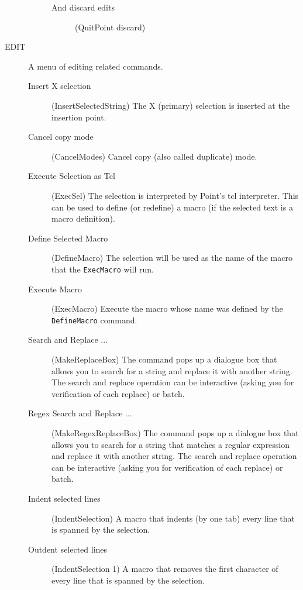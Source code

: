 \begin{description}
\begin{description}
\begin{description}
		\item[And discard edits] (QuitPoint discard)

	\end{description}

	\end{description}

\item[EDIT] A menu of editing related commands.
	\begin{description}

	\item[Insert X selection] (InsertSelectedString)
	The X (primary) selection is inserted at the
	insertion point.

	\item[Cancel copy mode] (CancelModes)
	Cancel copy (also called duplicate) mode.

	\item[Execute Selection as Tcl] (ExecSel)
		The selection is interpreted by Point's tcl
		interpreter.  This can be used to define
		(or redefine) a macro (if the selected text
		is a macro definition).

	\item[Define Selected Macro] (DefineMacro)
		The selection will be used as the name of the
		macro that the {\tt ExecMacro} will run.

	\item[Execute Macro] (ExecMacro)
		Execute the macro whose name was defined by the
		{\tt DefineMacro} command.

	\item[Search and Replace ...] (MakeReplaceBox)
	The command pops up a dialogue box that allows you to search
	for a string and replace it with another string.
	The search and replace operation can be interactive
	(asking you for verification of each replace) or batch.

	\item[Regex Search and Replace ...] (MakeRegexReplaceBox)
	The command pops up a dialogue box that allows you to search
	for a string that matches a regular expression
	and replace it with another string.
	The search and replace operation can be interactive
	(asking you for verification of each replace) or batch.

	\item[Indent selected lines] (IndentSelection)
		A macro that indents (by one tab) every line that
		is spanned by the selection.

	\item[Outdent selected lines] (IndentSelection 1)
		A macro that removes the first character of
		every line that is spanned by the selection.


\end{description}
\end{description}
